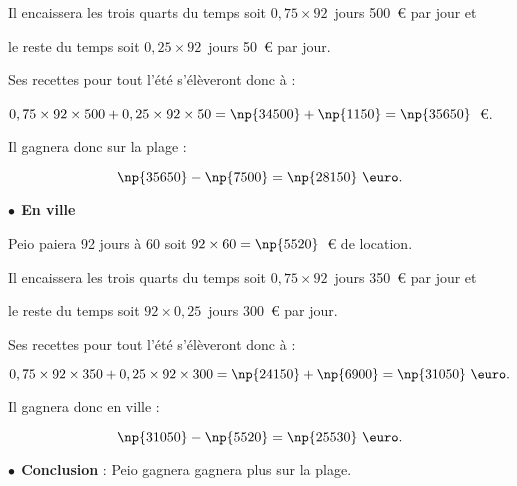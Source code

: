 Il encaissera les trois quarts du temps soit $0,75 \times 92$~jours 500~\euro{} par jour et 

le reste du temps soit $0,25 \times 92$~jours 50~\euro{} par jour.

Ses recettes pour tout l'été s'élèveront donc à :

\begin{center}$0,75 \times 92 \times 500 + 0,25 \times 92 \times 50 = \np{34500} + \np{1150} = \np{35650}$~\euro.\end{center}

Il gagnera donc sur la plage :

\[\np{35650} - \np{7500} = \np{28150}~\text{\euro}.\]

$\bullet~~$\textbf{En ville}

Peio paiera 92 jours  à 60 soit $92 \times 60   = \np{5520}$~\euro{} de location.

Il encaissera les trois quarts du temps soit $0,75 \times 92$~jours 350~\euro{} par jour et 

le reste du temps soit $92 \times 0,25$~jours 300~\euro{} par jour.

Ses recettes pour tout l'été s'élèveront donc à :

\[0,75 \times 92 \times 350 + 0,25 \times 92 \times 300 = \np{24150} + \np{6900} = \np{31050}~\text{\euro}.\]

Il gagnera donc en ville :

\[ \np{31050} - \np{5520} = \np{25530}~\text{\euro}.\]

$\bullet~~$\textbf{Conclusion} : Peio gagnera gagnera plus sur la plage.
 
\newpage

